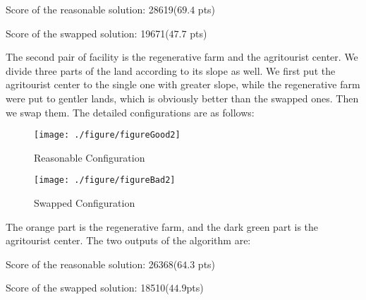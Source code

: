 \documentclass[./main.tex]{subfiles}
\begin{document}
    Score of the reasonable solution: 28619($69.4$ pts)

    Score of the swapped solution: 19671($47.7$ pts)

    The second pair of facility is the regenerative farm and the agritourist center.
    We divide three parts of the land according to its slope as well.
    We first put the agritourist center to the single one with greater slope, while the regenerative farm were
    put to gentler lands, which is obviously better than the swapped ones.
    Then we swap them.
    The detailed configurations are as follows:

    \begin{figure}[H]
        \centering
        \begin{minipage}{0.3\linewidth}
            \centering
            \texttt{[image: ./figure/figureGood2]}
            \caption{Reasonable Configuration}
            \label{fg2}
        \end{minipage}
        \begin{minipage}{0.3\linewidth}
            \centering
            \texttt{[image: ./figure/figureBad2]}
            \caption{Swapped Configuration}
            \label{fb2}
        \end{minipage}
    \end{figure}

    The orange part is the regenerative farm, and the dark green part is the agritourist center.
    The two outputs of the algorithm are:

    Score of the reasonable solution: 26368($64.3$ pts)

    Score of the swapped solution: 18510($44.9$pts)
\end{document}
